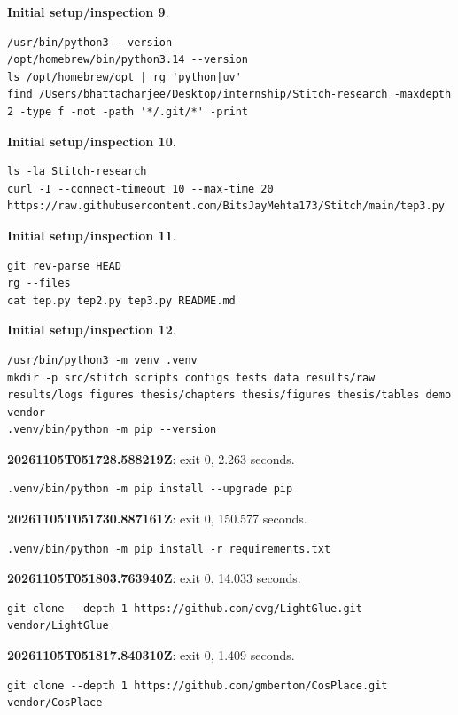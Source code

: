 \noindent\textbf{Initial setup/inspection 9}.
\begin{lstlisting}[numbers=none]
/usr/bin/python3 --version
/opt/homebrew/bin/python3.14 --version
ls /opt/homebrew/opt | rg 'python|uv'
find /Users/bhattacharjee/Desktop/internship/Stitch-research -maxdepth 2 -type f -not -path '*/.git/*' -print
\end{lstlisting}

\noindent\textbf{Initial setup/inspection 10}.
\begin{lstlisting}[numbers=none]
ls -la Stitch-research
curl -I --connect-timeout 10 --max-time 20 https://raw.githubusercontent.com/BitsJayMehta173/Stitch/main/tep3.py
\end{lstlisting}

\noindent\textbf{Initial setup/inspection 11}.
\begin{lstlisting}[numbers=none]
git rev-parse HEAD
rg --files
cat tep.py tep2.py tep3.py README.md
\end{lstlisting}

\noindent\textbf{Initial setup/inspection 12}.
\begin{lstlisting}[numbers=none]
/usr/bin/python3 -m venv .venv
mkdir -p src/stitch scripts configs tests data results/raw results/logs figures thesis/chapters thesis/figures thesis/tables demo vendor
.venv/bin/python -m pip --version
\end{lstlisting}

\noindent\textbf{20261105T051728.588219Z}: exit 0, 2.263 seconds.
\begin{lstlisting}[numbers=none]
.venv/bin/python -m pip install --upgrade pip
\end{lstlisting}

\noindent\textbf{20261105T051730.887161Z}: exit 0, 150.577 seconds.
\begin{lstlisting}[numbers=none]
.venv/bin/python -m pip install -r requirements.txt
\end{lstlisting}

\noindent\textbf{20261105T051803.763940Z}: exit 0, 14.033 seconds.
\begin{lstlisting}[numbers=none]
git clone --depth 1 https://github.com/cvg/LightGlue.git vendor/LightGlue
\end{lstlisting}

\noindent\textbf{20261105T051817.840310Z}: exit 0, 1.409 seconds.
\begin{lstlisting}[numbers=none]
git clone --depth 1 https://github.com/gmberton/CosPlace.git vendor/CosPlace
\end{lstlisting}

